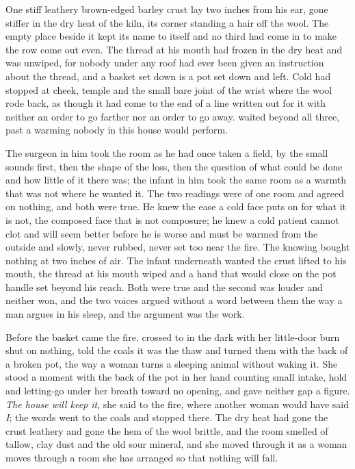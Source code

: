 One stiff leathery brown-edged barley crust lay two inches from his ear, gone stiffer in the dry heat of the kiln, its corner standing a hair off the wool. The empty place beside it kept its name to itself and no third had come in to make the row come out even. The thread at his mouth had frozen in the dry heat and was unwiped, for nobody under any roof had ever been given an instruction about the thread, and a basket set down is a pot set down and left. Cold had stopped at cheek, temple and the small bare joint of the wrist where the wool rode back, as though it had come to the end of a line written out for it with neither an order to go farther nor an order to go away.  waited beyond all three, past a warming nobody in this house would perform.

The surgeon in him took the room as he had once taken a field, by the small sounds first, then the shape of the loss, then the question of what could be done and how little of it there was; the infant in him took the same room as a warmth that was not where he wanted it. The two readings were of one room and agreed on nothing, and both were true. He knew the ease a cold face puts on for what it is not, the composed face that is not composure; he knew a cold patient cannot clot and will seem better before he is worse and must be warmed from the outside and slowly, never rubbed, never set too near the fire. The knowing bought nothing at two inches of air. The infant underneath wanted the crust lifted to his mouth, the thread at his mouth wiped and a hand that would close on the pot handle set beyond his reach. Both were true and the second was louder and neither won, and the two voices argued without a word between them the way a man argues in his sleep, and the argument was the work.

\scenebreak

Before the basket came the fire.  crossed to  in the dark with her little-door burn shut on nothing, told the coals it was the thaw and turned them with the back of a broken pot, the way a woman turns a sleeping animal without waking it. She stood a moment with the back of the pot in her hand counting small intake, hold and letting-go under her breath toward no opening, and gave neither gap a figure. \emph{The house will keep it}, she said to the fire, where another woman would have said \emph{I}; the words went to the coals and stopped there. The dry heat had gone the crust leathery and gone the hem of the wool brittle, and the room smelled of tallow, clay dust and the old sour mineral, and she moved through it as a woman moves through a room she has arranged so that nothing will fall.

